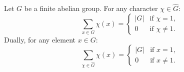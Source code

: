 Let $G$ be a finite abelian group. For any character $\chi \in \hat{G}$:
$$
\sum_{x \in G} \chi(x) = \begin{cases} |G| & \text{if } \chi = 1, \\ 0 & \text{if } \chi \neq 1. \end{cases}
$$
Dually, for any element $x \in G$:
$$
\sum_{\chi \in \hat{G}} \chi(x) = \begin{cases} |G| & \text{if } x = 1, \\ 0 & \text{if } x \neq 1. \end{cases}
$$

